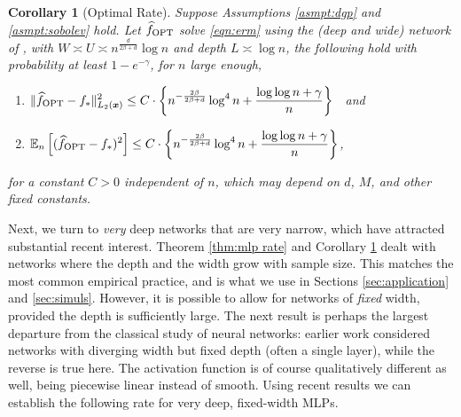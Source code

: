\documentclass[11pt]{article}
\newtheorem{corollary}{Corollary}
\numberwithin{equation}{section}
\theoremstyle{definition}
\newcommand{\E}{\mathbb{E}}
\newcommand{\bx}{\bm{x}}
\begin{document}
\begin{corollary}[Optimal Rate]
	\label{thm:optimal rate}
	Suppose Assumptions \ref{asmpt:dgp} and \ref{asmpt:sobolev} hold. Let $\widehat{f}_{\rm OPT}$ solve \eqref{eqn:erm} using the (deep and wide) network of \citet[][Theorem 1]{Yarotsky2017_NN}, with $W \asymp U \asymp n^{\frac{d}{2\beta + d}} \log n$ and depth $L \asymp \log n$, the following hold with probability at least $1 - e^{-\gamma}$, for $n$ large enough,
	\begin{enumerate}
		\item $\| \displaystyle \widehat{f}_{\rm OPT} - f_* \|_{L_2(\bx)}^2  \leq  C \cdot \left\{ n^{-\frac{2\beta}{2\beta+d}} \log^4 n + \frac{\log \log n + \gamma}{n} \right\}$ \ and 
		\item $\displaystyle \E_n  \left[ ( \widehat{f}_{\rm OPT} - f_* )^2 \right]  \leq C \cdot \left\{ n^{-\frac{2\beta}{2\beta+d}} \log^4 n + \frac{\log \log n + \gamma}{n} \right\} $,
	\end{enumerate}
	for a constant $C>0$ independent of $n$, which may depend on $d$, $M$, and other fixed constants.
\end{corollary}



Next, we turn to \emph{very} deep networks that are very narrow, which have attracted substantial recent interest. Theorem \ref{thm:mlp rate} and Corollary \ref{thm:optimal rate} dealt with networks where the depth and the width grow with sample size. This matches the most common empirical practice, and is what we use in Sections \ref{sec:application} and \ref{sec:simuls}. However, it is possible to allow for networks of \emph{fixed} width, provided the depth is sufficiently large. The next result is perhaps the largest departure from the classical study of neural networks: earlier work considered networks with diverging width but fixed depth (often a single layer), while the reverse is true here. The activation function is of course qualitatively different as well, being piecewise linear instead of smooth. Using recent results \citep{mhaskar2016deep,Hanin2017_WP,Yarotsky2018_WP} we can establish the following rate for very deep, fixed-width MLPs.
		
\end{document}
